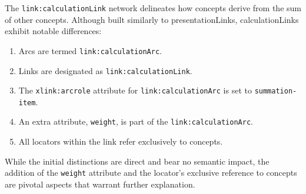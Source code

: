 

The \texttt{link:calculationLink} network delineates how concepts derive from the sum of other concepts.  
Although built similarly to presentationLinks, calculationLinks exhibit notable differences:  

\begin{enumerate}  
    \item Arcs are termed \texttt{link:calculationArc}.  
    \item Links are designated as \texttt{link:calculationLink}.  
    \item The \texttt{xlink:arcrole} attribute for \texttt{link:calculationArc} is set to \texttt{summation-item}.  
    \item An extra attribute, \texttt{weight}, is part of the \texttt{link:calculationArc}.  
    \item All locators within the link refer exclusively to concepts.  
\end{enumerate}  

While the initial distinctions are direct and bear no semantic impact,  
the addition of the \texttt{weight} attribute and the locator's exclusive reference to concepts are pivotal aspects that warrant further explanation.


